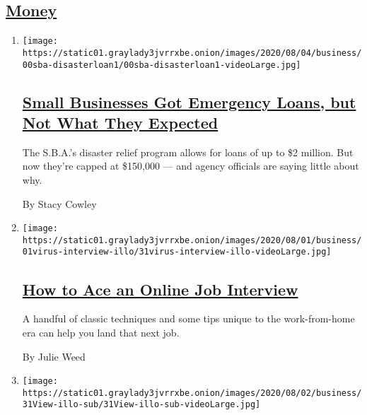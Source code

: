 \hypertarget{money}{%
\subsection{\texorpdfstring{\protect\hyperlink{}{Money}}{Money}}\label{money}}

\begin{enumerate}
\def\labelenumi{\arabic{enumi}.}
\item
  \texttt{[image: https://static01.graylady3jvrrxbe.onion/images/2020/08/04/business/00sba-disasterloan1/00sba-disasterloan1-videoLarge.jpg]}

  \hypertarget{small-businesses-got-emergency-loans-but-not-what-they-expected-1}{%
  \subsection{\texorpdfstring{\href{/2020/08/03/business/small-business-loans-coronavirus.html}{Small
  Businesses Got Emergency Loans, but Not What They
  Expected}}{Small Businesses Got Emergency Loans, but Not What They Expected}}\label{small-businesses-got-emergency-loans-but-not-what-they-expected-1}}

  The S.B.A.'s disaster relief program allows for loans of up to \$2
  million. But now they're capped at \$150,000 --- and agency officials
  are saying little about why.

  By Stacy Cowley
\item
  \texttt{[image: https://static01.graylady3jvrrxbe.onion/images/2020/08/01/business/01virus-interview-illo/31virus-interview-illo-videoLarge.jpg]}

  \hypertarget{how-to-ace-an-online-job-interview}{%
  \subsection{\texorpdfstring{\href{/2020/08/03/business/online-job-interview-tips.html}{How
  to Ace an Online Job
  Interview}}{How to Ace an Online Job Interview}}\label{how-to-ace-an-online-job-interview}}

  A handful of classic techniques and some tips unique to the
  work-from-home era can help you land that next job.

  By Julie Weed
\item
  \texttt{[image: https://static01.graylady3jvrrxbe.onion/images/2020/08/02/business/31View-illo-sub/31View-illo-sub-videoLarge.jpg]}

  \hypertarget{how-to-navigate-the-coronavirus-real-estate-market}{%
}
\end{enumerate}
